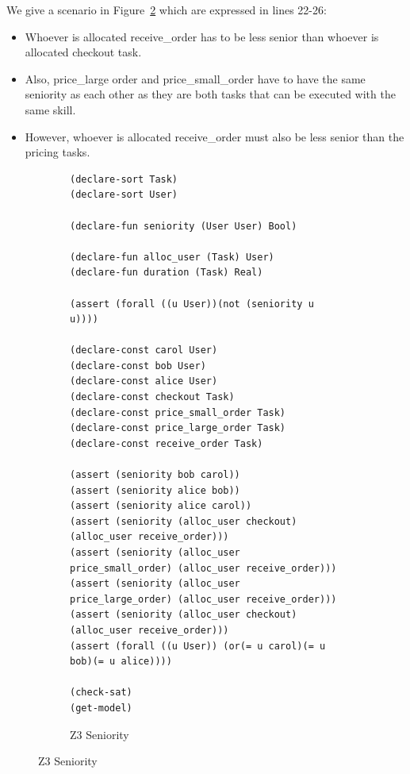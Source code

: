 \documentclass[a4paper]{report}
\begin{document}
We give a scenario in Figure~\ref{fig:Z3 Seniority} which are expressed in lines 22-26:
\begin{itemize}
\item Whoever is allocated receive\_order has to be less senior than whoever is allocated checkout task. 
\item Also, price\_large order and price\_small\_order have to have the same seniority as each other as they are both tasks that can be executed with the same skill.
\item However, whoever is allocated receive\_order must also be less senior than the pricing tasks. 
\end{itemize}

\makeatletter
\newcommand{\srcsize}{\@setfontsize{\srcsize}{10pt}{10pt}}
\makeatother

\begin{figure}[!h]
\begin{subfigure}{\textwidth}
\lstset{numbers=left, showspaces=false,
    showstringspaces=false, tabsize=2, breaklines=true,
    xleftmargin=5.0ex,
}
\begin{lstlisting}[frame=single]
(declare-sort Task) 
(declare-sort User) 

(declare-fun seniority (User User) Bool) 

(declare-fun alloc_user (Task) User) 
(declare-fun duration (Task) Real)

(assert (forall ((u User))(not (seniority u u))))

(declare-const carol User) 
(declare-const bob User) 
(declare-const alice User) 
(declare-const checkout Task)
(declare-const price_small_order Task)
(declare-const price_large_order Task)
(declare-const receive_order Task)

(assert (seniority bob carol)) 
(assert (seniority alice bob)) 
(assert (seniority alice carol))
(assert (seniority (alloc_user checkout) (alloc_user receive_order)))
(assert (seniority (alloc_user price_small_order) (alloc_user receive_order)))
(assert (seniority (alloc_user price_large_order) (alloc_user receive_order)))
(assert (seniority (alloc_user checkout) (alloc_user receive_order)))
(assert (forall ((u User)) (or(= u carol)(= u bob)(= u alice))))

(check-sat)
(get-model)
\end{lstlisting}
\caption{Z3 Seniority}
\label{fig:Z3 Seniority}
\end{subfigure}
\end{figure}
\clearpage
\end{document}
